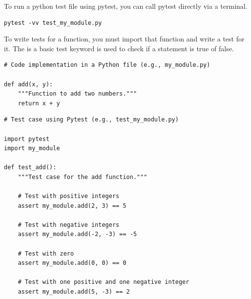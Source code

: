 \myindent To run a python test file using pytest, you can call pytest directly via a terminal.
\begin{lstlisting}
pytest -vv test_my_module.py
\end{lstlisting}

To write tests for a function, you must import that function and write a test for it. The  is a basic test keyword is used to check if a statement is true of false.
\begin{lstlisting}
# Code implementation in a Python file (e.g., my_module.py)

def add(x, y):
    """Function to add two numbers."""
    return x + y
\end{lstlisting}

\begin{lstlisting}
# Test case using Pytest (e.g., test_my_module.py)

import pytest
import my_module

def test_add():
    """Test case for the add function."""

    # Test with positive integers
    assert my_module.add(2, 3) == 5
    
    # Test with negative integers
    assert my_module.add(-2, -3) == -5
    
    # Test with zero
    assert my_module.add(0, 0) == 0
    
    # Test with one positive and one negative integer
    assert my_module.add(5, -3) == 2
\end{lstlisting}


